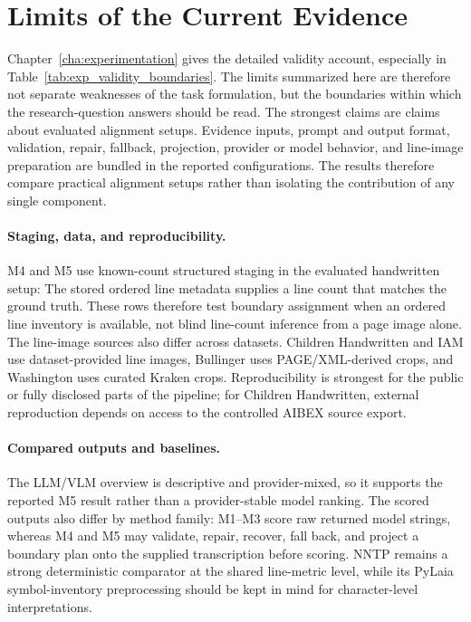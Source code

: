 \section{Limits of the Current Evidence}
\label{sec:conclusion_limits}

Chapter~\ref{cha:experimentation} gives the detailed validity account, especially in Table~\ref{tab:exp_validity_boundaries}. The limits summarized here are therefore not separate weaknesses of the task formulation, but the boundaries within which the research-question answers should be read. The strongest claims are claims about evaluated alignment setups. Evidence inputs, prompt and output format, validation, repair, fallback, projection, provider or model behavior, and line-image preparation are bundled in the reported configurations. The results therefore compare practical alignment setups rather than isolating the contribution of any single component.

\paragraph{Staging, data, and reproducibility.}
M4 and M5 use known-count structured staging in the evaluated handwritten setup: The stored ordered line metadata supplies a line count that matches the ground truth. These rows therefore test boundary assignment when an ordered line inventory is available, not blind line-count inference from a page image alone. The line-image sources also differ across datasets. Children Handwritten and IAM use dataset-provided line images, Bullinger uses PAGE/XML-derived crops, and Washington uses curated Kraken crops. Reproducibility is strongest for the public or fully disclosed parts of the pipeline; for Children Handwritten, external reproduction depends on access to the controlled AIBEX source export.

\paragraph{Compared outputs and baselines.}
The LLM/VLM overview is descriptive and provider-mixed, so it supports the reported M5 result rather than a provider-stable model ranking. The scored outputs also differ by method family: M1--M3 score raw returned model strings, whereas M4 and M5 may validate, repair, recover, fall back, and project a boundary plan onto the supplied transcription before scoring. NNTP remains a strong deterministic comparator at the shared line-metric level, while its PyLaia symbol-inventory preprocessing should be kept in mind for character-level interpretations.

